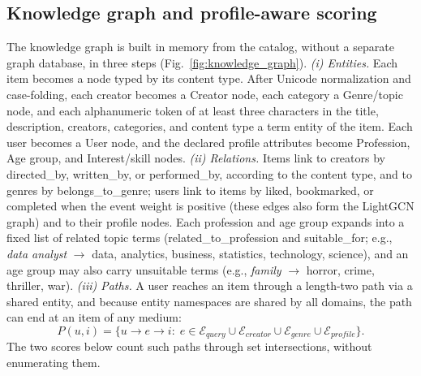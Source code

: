 \documentclass[3p,times,procedia]{elsarticle}
\begin{document}
\subsection{Knowledge graph and profile-aware scoring}
\label{sec:kg}
The knowledge graph is built in memory from the catalog, without a separate graph database, in three steps (Fig.~\ref{fig:knowledge_graph}).
\emph{(i) Entities.} Each item becomes a node typed by its content type. After Unicode normalization and case-folding, each creator becomes a Creator node, each category a Genre/topic node, and each alphanumeric token of at least three characters in the title, description, creators, categories, and content type a term entity of the item. Each user becomes a User node, and the declared profile attributes become Profession, Age group, and Interest/skill nodes.
\emph{(ii) Relations.} Items link to creators by directed\_by, written\_by, or performed\_by, according to the content type, and to genres by belongs\_to\_genre; users link to items by liked, bookmarked, or completed when the event weight is positive (these edges also form the LightGCN graph) and to their profile nodes. Each profession and age group expands into a fixed list of related topic terms (related\_to\_profession and suitable\_for; e.g., \emph{data analyst} $\rightarrow$ data, analytics, business, statistics, technology, science), and an age group may also carry unsuitable terms (e.g., \emph{family} $\rightarrow$ horror, crime, thriller, war).
\emph{(iii) Paths.} A user reaches an item through a length-two path via a shared entity, and because entity namespaces are shared by all domains, the path can end at an item of any medium:
\begin{equation}
    P(u,i)=\{u\rightarrow e\rightarrow i:\;
    e\in \mathcal{E}_{\mathit{query}}\cup\mathcal{E}_{\mathit{creator}}\cup\mathcal{E}_{\mathit{genre}}\cup\mathcal{E}_{\mathit{profile}}\}.
    \label{eq:paths}
\end{equation}
The two scores below count such paths through set intersections, without enumerating them.
\end{document}
